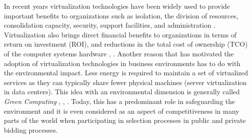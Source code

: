 	
	In recent years virtualization technologies have been widely used to provide important benefits to organizations such as isolation, the division of resources, consolidation capacity, security, support facilities, and administration \cite{Varasteh2017}.
	Virtualization also brings direct financial benefits to organizations in terms of return on investment (ROI), and reductions in the total cost of ownership (TCO) of the computer systems hardware \cite{Solis2014}, \cite{AbdElRahem2016}. Another reason that has motivated the adoption of virtualization technologies in business environments has to do with the environmental impact. 
	Less energy is required to maintain a set of virtualized services as they can typically share fewer physical machines (server virtualization in data centers). This idea with an environmental dimension is generally called \textit{Green Computing} \cite {Thathera2015}, \cite{Ranjith2017}, \cite {Jing2011}. Today, this has a predominant role in safeguarding the environment and it is even considered as an aspect of competitiveness in many parts of the world when participating in selection processes in public and private bidding processes.
	
	 
	

